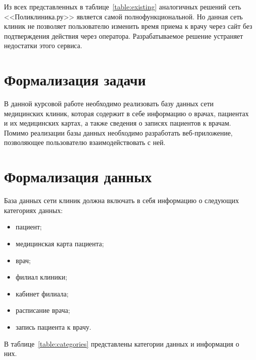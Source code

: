 Из всех представленных в таблице~\ref{table:existing} аналогичных решений сеть <<Поликлиника.ру>> является самой полнофункциональной. 
Но данная сеть клиник не позволяет пользователю изменить время приема к врачу через сайт без подтверждения действия через оператора. 
Разрабатываемое решение устраняет недостатки этого сервиса.

\section{Формализация задачи}
В данной курсовой работе необходимо реализовать базу данных сети медицинских клиник, которая содержит в себе информацию о врачах, пациентах и их медицинских картах, а также сведения о записях пациентов к врачам.
Помимо реализации базы данных необходимо разработать веб-приложение, позволяющее пользователю взаимодействовать с ней.

\section{Формализация данных}

База данных сети клиник должна включать в себя информацию о следующих категориях данных: 
\begin{itemize}
	\item пациент;
	\item медицинская карта пациента;
	\item врач;
	\item филиал клиники;
	\item кабинет филиала;
	\item расписание врача;
	\item запись пациента к врачу.
\end{itemize}

В таблице~\ref{table:categories} представлены категории данных и информация о них.

